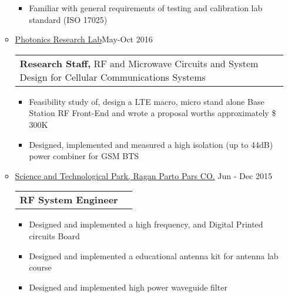 \documentclass[a4paper,10pt]{article} %
\begin{document}
\begin{itemize}
\begin{itemize}
\begin{itemize}
	 		\item 
	 		Familiar with general requirements of testing and calibration lab standard  (ISO 17025)\\
	 		
	 	\end{itemize}
	 	\item \href{http://prl.ut.ac.ir/}{Photonics Research Lab}\hfill  May-Oct 2016  \\
	 	\begin{tabular}{lr}
	 		{\bf Research Staff, } RF and Microwave Circuits and System Design for Cellular Communications Systems &\\	
	 	\end{tabular}
	 	\begin{itemize}
	 		\item
	 		Feasibility study of, design a LTE macro, micro stand alone Base Station RF Front-End and wrote a proposal worths approximately \$ 300K	
	 		\item
	 		Designed, implemented and measured a high isolation (up to 44dB) power combiner for GSM BTS\\
	 		
	 	\end{itemize}
	 	
	 	\item 
	 	\href{http://www.raganparto.com/Pos.html}{Science and Technological Park, Ragan Parto Pars CO.} \hfill Jun - Dec 2015 \\
	 	\begin{tabular}{lr}
	 		{\bf RF System Engineer}& \\
	 	\end{tabular}
	 	\begin{itemize} 	
	 		\item
	 		Designed and implemented a high frequency, and Digital Printed circuits Board  
	 		\item
	 		Designed and implemented a educational antenna kit for antenna lab course 
	 			\item
	 			Designed and implemented high power waveguide filter   \\
	 	\end{itemize}
	 	
	 \end{itemize}
\end{itemize}
\end{document}
